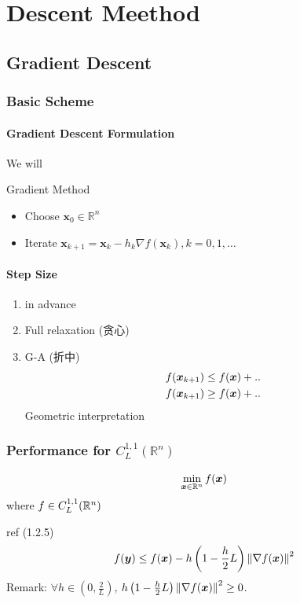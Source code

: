 \newpage
\section{Descent Meethod}
\subsection{Gradient Descent}
\subsubsection{Basic Scheme}

\paragraph{Gradient Descent Formulation}We will 

Gradient Method
\begin{itemize}
    \item Choose $\bm x_0\in \mathbb{R}^n$
    \item Iterate $\bm x_{k+1}=\bm x_k-h_k\nabla f(\bm x_k),k=0,1,\dots$
\end{itemize}

\paragraph{Step Size}\quad 
\begin{enumerate}
    \item in advance
    \item Full relaxation (贪心)
    \item G-A (折中)
    \begin{align*}
        f(\bm{x}_{k+1})\le f(\bm{x})+ ..\\
        f(\bm{x}_{k+1})\ge f(\bm{x})+ ..\\
    \end{align*}
    \subitem Geometric interpretation
\end{enumerate}

\subsubsection{Performance for \texorpdfstring{$C_L^{1,1}(\mathbb{R}^n)$}. }
\begin{align*}
    \min_{\bm{x}\in\mathbb{R}^n}f(\bm{x})
\end{align*}
where $f\in C_L^{1,1}(\mathbb{R}^n)$

ref (1.2.5)
\begin{align*}
    f(\bm{y})\le f(\bm{x})-h\left( 1-\frac{h}{2}L \right)\left\lVert\nabla f(\bm{x})\right\rVert^2
\end{align*}
Remark: $\forall h\in \left( 0,\frac{2}{L} \right)$, $h\left( 1-\frac{h}{2}L \right)\left\lVert\nabla f(\bm{x})\right\rVert^2\ge 0$. 

